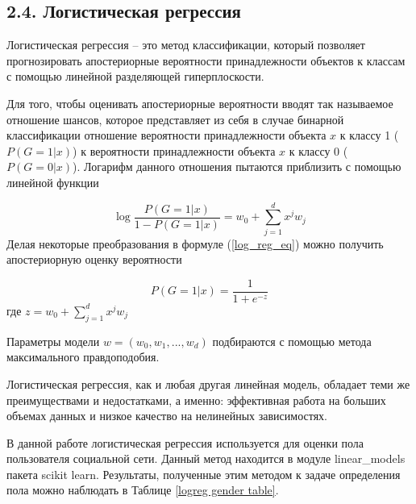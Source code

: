 \subsection{2.4. Логистическая регрессия}
Логистическая регрессия \cite{ESLII} -- это метод классификации, который позволяет прогнозировать апостериорные вероятности принадлежности объектов к классам с помощью линейной разделяющей гиперплоскости. 

Для того, чтобы оценивать апостериорные вероятности вводят так называемое отношение шансов, которое представляет из себя в случае бинарной классификации отношение вероятности принадлежности объекта $x$ к классу 1 ($P(G=1|x)$) к вероятности принадлежности объекта $x$ к классу 0 ($P(G=0|x)$). Логарифм данного отношения пытаются приблизить с помощью линейной функции

\begin{equation}\label{log_reg_eq}
\log \frac{P(G=1|x)}{1 - P(G=1|x)} = w_0 + \sum_{j=1}^{d}x^j w_j
\end{equation}
Делая некоторые преобразования в формуле  (\ref{log_reg_eq}) можно получить апостериорную оценку вероятности

$$P(G=1|x) = \frac{1}{1 + e^{-z}}$$
где $z = w_0 + \sum_{j=1}^{d}x^j w_j$

Параметры модели $w = (w_0, w_1, ... ,w_d)$ подбираются с помощью метода максимального правдоподобия.

Логистическая регрессия, как и любая другая линейная модель, обладает теми же преимуществами и недостатками, а именно: эффективная работа на больших объемах данных и низкое качество на нелинейных зависимостях. 

В данной работе логистическая регрессия используется для оценки пола пользователя социальной сети. Данный метод находится в модуле linear\_models пакета scikit learn.  Результаты, полученные этим методом к задаче определения пола можно наблюдать в Таблице \ref{logreg gender table}.

